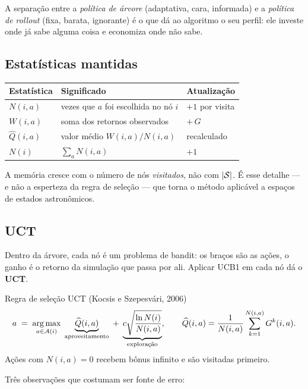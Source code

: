 \documentclass[a4paper, 11pt]{article}
\newcommand{\Nv}[1]{N(#1)}
\newcommand{\Qh}{\widehat{Q}}
\newcommand{\ret}{G}
\begin{document}
A separação entre a \emph{política de árvore} (adaptativa, cara, informada) e a
\emph{política de rollout} (fixa, barata, ignorante) é o que dá ao algoritmo o
seu perfil: ele investe onde já sabe alguma coisa e economiza onde não sabe.

\subsection{Estatísticas mantidas}

\begin{center}
\begin{tabular}{@{}lll@{}}
  \toprule
  \textbf{Estatística} & \textbf{Significado} & \textbf{Atualização} \\
  \midrule
  $\Nv{i,a}$ & vezes que $a$ foi escolhida no nó $i$ & $+1$ por visita \\
  $W(i,a)$   & soma dos retornos observados          & $+\,\ret$ \\
  $\Qh(i,a)$ & valor médio $W(i,a)/\Nv{i,a}$         & recalculado \\
  $\Nv{i}$   & $\sum_a \Nv{i,a}$                     & $+1$ \\
  \bottomrule
\end{tabular}
\end{center}

A memória cresce com o número de nós \emph{visitados}, não com $\lvert\mathcal{S}\rvert$.
É esse detalhe --- e não a esperteza da regra de seleção --- que torna o método
aplicável a espaços de estados astronômicos.

\subsection{UCT}

Dentro da árvore, cada nó é um problema de bandit: os braços são as ações, o
ganho é o retorno da simulação que passa por ali. Aplicar UCB1 em cada nó dá o
\textbf{UCT}.

\begin{teobox}{Regra de seleção UCT (Kocsis e Szepesvári, 2006)}
\[
  a \;=\; \argmax_{a\in\gA(i)}\;
  \underbrace{\Qh(i,a)}_{\text{aproveitamento}}
  \;+\;
  \underbrace{c\sqrt{\frac{\ln \Nv{i}}{\Nv{i,a}}}}_{\text{exploração}},
  \qquad
  \Qh(i,a)=\frac{1}{\Nv{i,a}}\sum_{k=1}^{\Nv{i,a}} \ret^k(i,a).
\]
Ações com $\Nv{i,a}=0$ recebem bônus infinito e são visitadas primeiro.
\end{teobox}

Três observações que costumam ser fonte de erro:
\end{document}
